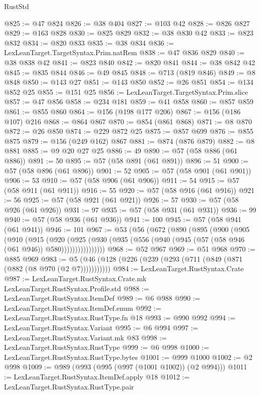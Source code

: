 \begin{lexlean}{RustStd}
\begin{coremodule}
{\begin{coremodule}
{{{{{{{{{{{{{{@825 := @47 @824
@826 := @38 @404
@827 := @103 @42
@828 := @826 @827
@829 := @163 @828
@830 := @825 @829
@832 := @38 @830 @42
@833 := @823 @832
@834 := @820 @833
@835 := @38 @834
@836 := LexLeanTarget.TargetSyntax.Prim.natRem
@838 := @47 @836 @829
@840 := @38 @838 @42
@841 := @823 @840
@842 := @820 @841
@844 := @38 @842 @42
@845 := @835 @844
@846 := @49 @845
@848 := @713 (@819 @846)
@849 := @8 @848
@850 := @143 @27
@851 := @143 @850
@852 := @26 @851
@854 := @134 @852 @25
@855 := @151 @25
@856 := LexLeanTarget.TargetSyntax.Prim.slice
@857 := @47 @856
@858 := @234 @181
@859 := @41 @858
@860 := @857 @859
@861 := @855 @860
@864 := @156 (@198 @177 @206)
@867 := @156 (@186 @107) @216
@868 := @864 @867
@870 := @854 (@861 @868)
@871 := @8 @870
@872 := @26 @850
@874 := @229 @872 @25
@875 := @857 @699
@876 := @855 @875
@879 := @156 (@249 @162) @867
@881 := @874 (@876 @879)
@882 := @8 @881
@885 := @9 @20 @27 @25
@886 := 49
@890 := @57 (@58 @886 (@61 @886))
@891 := 50
@895 := @57 (@58 @891 (@61 @891))
@896 := 51
@900 := @57 (@58 @896 (@61 @896))
@901 := 52
@905 := @57 (@58 @901 (@61 @901))
@906 := 53
@910 := @57 (@58 @906 (@61 @906))
@911 := 54
@915 := @57 (@58 @911 (@61 @911))
@916 := 55
@920 := @57 (@58 @916 (@61 @916))
@921 := 56
@925 := @57 (@58 @921 (@61 @921))
@926 := 57
@930 := @57 (@58 @926 (@61 @926))
@931 := 97
@935 := @57 (@58 @931 (@61 @931))
@936 := 99
@940 := @57 (@58 @936 (@61 @936))
@941 := 100
@945 := @57 (@58 @941 (@61 @941))
@946 := 101
@967 := @53
    (@56
      (@672
        (@890
          (@895
            (@900
              (@905
                (@910
                  (@915
                    (@920
                      (@925
                        (@930
                          (@935 (@556 (@940 (@945 (@57 (@58 @946 (@61 @946)) @580))))))))))))))))
@968 := @52 @967
@969 := @51 @968
@970 := @885 @969
@983 := @5 (@46 (@128 (@226 (@239 (@293 (@711 (@849 (@871 (@882 (@8 @970 (@2 @7)))))))))))
@984 := LexLeanTarget.RustSyntax.Crate
@987 := LexLeanTarget.RustSyntax.Crate.mk LexLeanTarget.RustSyntax.Profile.std
@988 := LexLeanTarget.RustSyntax.ItemDef
@989 := @6 @988
@990 := LexLeanTarget.RustSyntax.ItemDef.enum
@992 := LexLeanTarget.RustSyntax.RustType.fn @18
@993 := @990 @992
@994 := LexLeanTarget.RustSyntax.Variant
@995 := @6 @994
@997 := LexLeanTarget.RustSyntax.Variant.mk @83
@998 := LexLeanTarget.RustSyntax.RustType
@999 := @6 @998
@1000 := LexLeanTarget.RustSyntax.RustType.bytes
@1001 := @999 @1000
@1002 := @2 @998
@1009 := @989 (@993 (@995 (@997 (@1001 @1002)) (@2 @994)))
@1011 := LexLeanTarget.RustSyntax.ItemDef.apply @18
@1012 := LexLeanTarget.RustSyntax.RustType.pair
}}}}}}}}}}}}}}
\end{coremodule}}
\end{coremodule}
\end{lexlean}
